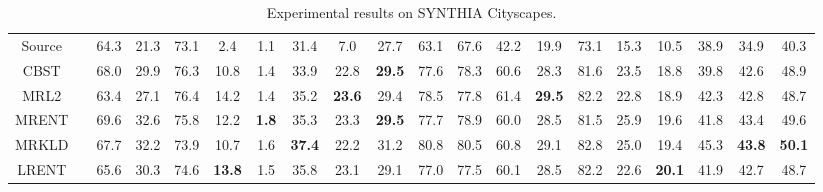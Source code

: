 \documentclass[10pt,twocolumn,letterpaper]{article}
\theoremstyle{plain}
\begin{document}
\begin{table*}[!t]
{\begin{tabular}{c|c|cccccccccccccccc|c|c}
		\hline
		Source & \multirow{6}{0.1\linewidth}{\centering{DeepLabv2}} & 64.3 & 21.3 & 73.1 & 2.4 & 1.1 & 31.4 & 7.0 & 27.7 & 63.1 & 67.6 & 42.2 & 19.9 & 73.1 & 15.3 & 10.5 & 38.9 & 34.9 & 40.3\\
		CBST & & 68.0 & 29.9 & 76.3 & 10.8 & 1.4 & 33.9 & 22.8 & \textbf{29.5} & 77.6 & 78.3 & 60.6 & 28.3 & 81.6 & 23.5 & 18.8 & 39.8 & 42.6 & 48.9\\
		MRL2 &  & 63.4 & 27.1 & 76.4 & 14.2 & 1.4 & 35.2 & \textbf{23.6} & 29.4 & 78.5 & 77.8 & 61.4 & \textbf{29.5} & 82.2 & 22.8 & 18.9 & 42.3 & 42.8 & 48.7\\
		MRENT & & 69.6 & 32.6 & 75.8 & 12.2 & \textbf{1.8} & 35.3 & 23.3 & \textbf{29.5} & 77.7 & 78.9 & 60.0 & 28.5 & 81.5 & 25.9 & 19.6 & 41.8 & 43.4 & 49.6\\
		MRKLD & & 67.7 & 32.2 & 73.9 & 10.7 & 1.6 & \textbf{37.4} & 22.2 & 31.2 & 80.8 & 80.5 & 60.8 & 29.1 & 82.8 & 25.0 & 19.4 & 45.3 & \textbf{43.8} & \textbf{50.1}\\
		LRENT & & 65.6 & 30.3 & 74.6 & \textbf{13.8} & 1.5 & 35.8 & 23.1 & 29.1 & 77.0 & 77.5 & 60.1 & 28.5 & 82.2 & 22.6 & \textbf{20.1} & 41.9 & 42.7 & 48.7\\
		\hline
	\end{tabular}
	}
	\vspace{-2mm}
	\caption{Experimental results on SYNTHIA  Cityscapes.}
	\label{table:syncity}
\end{table*}
\end{document}
